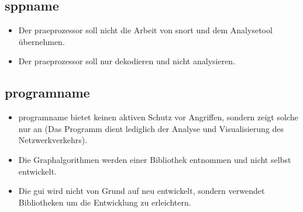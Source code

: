\subsection{\gls{sppname}}
\begin{itemize}
\item Der \gls{praeprozessor} soll nicht die Arbeit von \gls{snort} und dem Analysetool übernehmen.

\item Der \gls{praeprozessor} soll nur dekodieren und nicht analysieren.

\end{itemize}

\subsection{\gls{programname}}
\begin{itemize}

\item \gls{programname} bietet keinen aktiven Schutz vor Angriffen, sondern zeigt solche nur an (Das Programm dient lediglich der Analyse und Visualisierung des Netzwerkverkehrs).

\item Die Graphalgorithmen  werden einer Bibliothek entnommen und nicht selbst entwickelt.

\item Die \gls{gui} wird nicht von Grund auf neu entwickelt, sondern verwendet Bibliotheken um die Entwicklung zu erleichtern.

\end{itemize}
